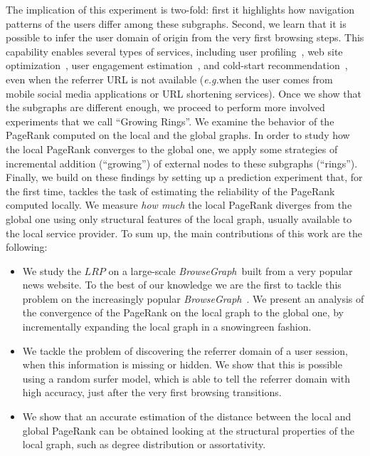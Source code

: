 \documentclass{sig-alternate-2013}
\newcommand{\eg}{\emph{e.g.}}
\newcommand{\bgraph}{\textit{BrowseGraph}}
\begin{document}
% 
The implication of this experiment is two-fold: first it highlights how navigation patterns of the users differ among these subgraphs. 
% 
Second, we learn that it is possible to infer the user domain of origin from the very first browsing steps. This capability enables several types of services, including user profiling~\cite{chiarandini12discovering}, web site optimization~\cite{WeischedelWOW2006}, user engagement estimation~\cite{lehmann2013measuring}, and cold-start recommendation~\cite{TrevisiolRecSys14}, even when the referrer URL is not available (\eg when the user comes from mobile social media applications or URL shortening services).
% 
Once we show that the subgraphs are different enough, we proceed to perform more involved experiments that we call ``Growing Rings''. We examine the behavior of the PageRank computed on the local and the global graphs. 
In order to study how the local PageRank converges to the global one, we apply some strategies of incremental addition (``growing'') of external nodes to these subgraphs (``rings''). 
% 
Finally, we build on these findings by setting up a prediction experiment that, for the first time, tackles the task of estimating the reliability of the PageRank computed locally. We measure \textit{how much} the local PageRank diverges from the global one using only structural features of the local graph, usually available to the local service provider.
% 
To sum up, the main contributions of this work are the following:
\begin{itemize}
  \item We study the $LRP$ on a large-scale \bgraph\ built from a very popular news website. To the best of our knowledge we are the first to tackle this problem on the increasingly popular \bgraph~\cite{TrevisiolRecSys14,trevisiol12image,chiarandini12discovering,Liu2008a}. We present an analysis of the convergence of the PageRank on the local graph to the global one, by incrementally expanding the local graph in a snowingreen fashion.
  \item We tackle the problem of discovering the referrer domain of a user session, when this information is missing or hidden. We show that this is possible using a random surfer model, which is able to tell the referrer domain with high accuracy, just after the very first browsing transitions. 
  \item We show that an accurate estimation of the distance between the local and global PageRank can be obtained looking at the structural properties of the local graph, such as degree distribution or assortativity. 
\end{itemize}
\end{document}

